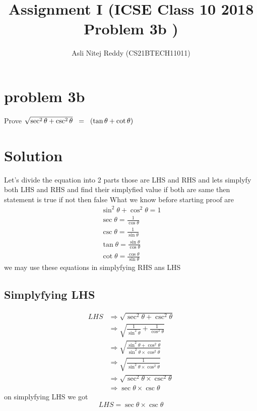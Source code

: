 \documentclass[12pt,twocolumn]{article}
\title{Assignment I (ICSE Class 10 2018 Problem 3b )}
\author{Asli Nitej Reddy (CS21BTECH11011)}
\begin{document}
\vspace{3cm}
\maketitle

\section*{problem 3b}
 Prove $\sqrt{\sec^2{\theta}+\csc^2{\theta}}\hspace{0.2cm} =\hspace{0.2cm} (\tan{\theta}+\cot{\theta})$

\section*{Solution}

Let's divide the equation into 2 parts those are LHS and RHS and lets simplyfy both LHS and RHS and find their simplyfied value if both are same then statement is true if not then false
\newline
What we know before starting proof are 
\begin{align}
 \sin^2{\theta}+\cos^2{\theta} = 1 \\
 \sec{\theta}=\frac{1}{\cos{\theta}} \\
 \csc{\theta}=\frac{1}{\sin{\theta}} \\
 \tan{\theta}=\frac{\sin{\theta}}{\cos{\theta}} \\
 \cot{\theta}=\frac{\cos{\theta}}{\sin{\theta}} 
\end{align}
we may use these equations in simplyfying RHS ans LHS
\subsection*{Simplyfying LHS}
 \begin{align}
  LHS &\Rightarrow \sqrt{\sec^2{\theta}+\csc^2{\theta}}  \\
     &\Rightarrow \sqrt{\frac{1}{\sin^2{\theta}}+\frac{1}{\cos^2{\theta}}}\\
     &\Rightarrow \sqrt{\frac{\sin^2{\theta}+\cos^2{\theta}}{\sin^2{\theta}\times\cos^2{\theta}}} \\
     &\Rightarrow \sqrt{\frac{1}{\sin^2{\theta}\times\cos^2{\theta}}} \\
     &\Rightarrow \sqrt{\sec^2{\theta}\times\csc^2{\theta}} \\
     &\Rightarrow \sec{\theta}\times\csc{\theta}  
 \end{align}
 on simplyfying LHS we got 
 \begin{equation}
 \label{eqn:part1end}
 LHS = \sec{\theta}\times\csc{\theta}
 \end{equation}
\end{document}
